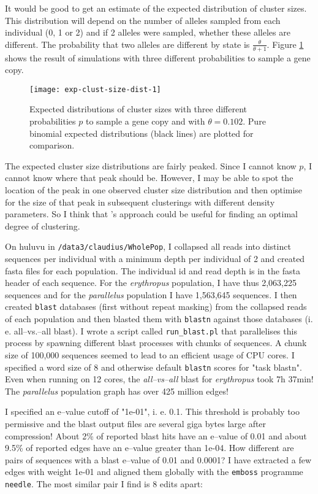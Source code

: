 \documentclass{article}\usepackage[]{graphicx}\usepackage[]{color}
\begin{document}
It would be good to get an estimate of the expected distribution of cluster sizes. This distribution will depend on the number of alleles sampled from each individual (0, 1 or 2) and if 2 alleles were sampled, whether these alleles are different. The probability that two alleles are different by state is $\frac{\theta}{\theta +1}$. Figure \ref{Fig:exp-clust-size-dist-1} shows the result of simulations with three different probabilities to sample a gene copy.
\begin{figure}
\centering
\texttt{[image: exp-clust-size-dist-1]}
\caption{Expected distributions of cluster sizes with three different probabilities $p$ to sample a gene copy and with $\theta = 0.102$. Pure binomial expected distributions (black lines) are plotted for comparison.}
\label{Fig:exp-clust-size-dist-1}
\end{figure}
The expected cluster size distributions are fairly peaked. Since I cannot know $p$, I cannot know where that peak should be. However, I may be able to spot the location of the peak in one observed cluster size distribution and then optimise for the size of that peak in subsequent clusterings with different density parameters. So I think that \cite{Roettger2013}'s approach could be useful for finding an optimal degree of clustering.

On huluvu in \texttt{/data3/claudius/WholePop}, I collapsed all reads into distinct sequences per individual with a minimum depth per individual of 2 and created fasta files for each population. The individual id and read depth is in the fasta header of each sequence. For the \textit{erythropus} population, I have thus 2,063,225 sequences and for the \textit{parallelus} population I have 1,563,645 sequences.
I then created \texttt{blast} databases (first without repeat masking) from the collapsed reads of each population and then blasted them with \texttt{blastn} against those databases (i. e. all--vs.--all blast). I wrote a script called \texttt{run\_blast.pl} that parallelises this process by spawning different blast processes with chunks of sequences. A chunk size of 100,000 sequences seemed to lead to an efficient usage of CPU cores. I specified a word size of 8 and otherwise default \texttt{blastn} scores for "task blastn". Even when running on 12 cores, the \emph{all--vs--all} blast for \textit{erythropus} took 7h 37min!  The \textit{parallelus} population graph has over 425 million edges! 

I specified an e--value cutoff of "1e-01", i. e. 0.1. This threshold is probably too permissive and the blast output files are several giga bytes large after compression! About 2\% of reported blast hits have an e--value of 0.01 and about 9.5\% of reported edges have an e--value greater than 1e-04. How different are pairs of sequences with a blast e--value of 0.01 and 0.0001? I have extracted a few edges with weight 1e-01 and aligned them globally with the \texttt{emboss} programme \texttt{needle}. The most similar pair I find is 8 edits apart:
\end{document}
